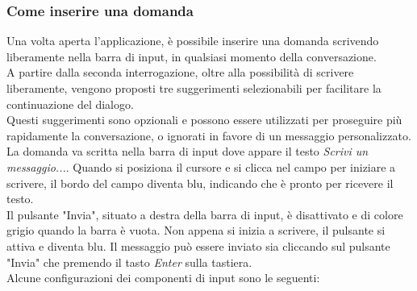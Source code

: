\subsubsection{Come inserire una domanda}  
\label{subsec:come_inserire_domanda}  

Una volta aperta l'applicazione, è possibile inserire una domanda scrivendo liberamente nella barra di input, in qualsiasi momento della conversazione.\\
A partire dalla seconda interrogazione, oltre alla possibilità di scrivere liberamente, vengono proposti tre suggerimenti selezionabili per facilitare la continuazione del dialogo.\\
Questi suggerimenti sono opzionali e possono essere utilizzati per proseguire più rapidamente la conversazione, o ignorati in favore di un messaggio personalizzato.\\
La domanda va scritta nella barra di input dove appare il testo \textit{Scrivi un messaggio...}. Quando si posiziona il cursore e si clicca nel campo per iniziare a scrivere, il bordo del campo diventa blu, indicando che è pronto per ricevere il testo.\\
Il pulsante "Invia", situato a destra della barra di input, è disattivato e di colore grigio quando la barra è vuota. Non appena si inizia a scrivere, il pulsante si attiva e diventa blu.
Il messaggio può essere inviato sia cliccando sul pulsante "Invia" che premendo il tasto \textit{Enter} sulla tastiera.\\
Alcune configurazioni dei componenti di input sono le seguenti:

